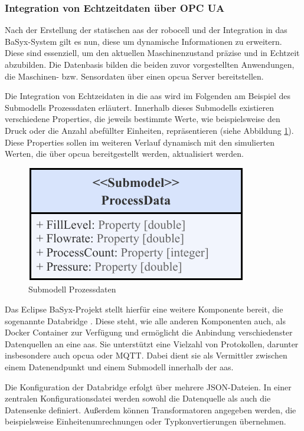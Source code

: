 \subsubsection{Integration von Echtzeitdaten über OPC UA}
Nach der Erstellung der statischen \acs{aas} der robocell und der Integration in das BaSyx-System gilt es nun, diese um dynamische Informationen zu erweitern.
Diese sind essenziell, um den aktuellen Maschinenzustand präzise und in Echtzeit abzubilden.
Die Datenbasis bilden die beiden zuvor vorgestellten Anwendungen, die Maschinen- bzw. Sensordaten über einen \acs{opcua} Server bereitstellen.

Die Integration von Echtzeidaten in die \acs{aas} wird im Folgenden am Beispiel des Submodells Prozessdaten erläutert.
Innerhalb dieses Submodells existieren verschiedene Properties, die jeweils bestimmte Werte, wie beispielsweise den Druck oder die Anzahl abefüllter Einheiten, repräsentieren (siehe Abbildung \ref{fig:SubmodellProzessdaten}). %
Diese Properties sollen im weiteren Verlauf dynamisch mit den simulierten Werten, die über \acs{opcua} bereitgestellt werden, aktualisiert werden.

\begin{figure}[htbp]
    \centering
    \includegraphics{Bilder/OPCUA/SubmodellProzessdaten.pdf}
    \caption{Submodell Prozessdaten}
    \label{fig:SubmodellProzessdaten}
\end{figure}

Das Eclipse BaSyx-Projekt stellt hierfür eine weitere Komponente bereit, die sogenannte Databridge \cite{BaSyxDatabridge}.
Diese steht, wie alle anderen Komponenten auch, als Docker Container zur Verfügung und ermöglicht die Anbindung verschiedenster Datenquellen an eine \acs{aas}.
Sie unterstützt eine Vielzahl von Protokollen, darunter insbesondere auch \acs{opcua} oder MQTT.
Dabei dient sie als Vermittler zwischen einem Datenendpunkt und einem Submodell innerhalb der \acs{aas}.

Die Konfiguration der Databridge erfolgt über mehrere JSON-Dateien.
In einer zentralen Konfigurationsdatei werden sowohl die Datenquelle als auch die Datensenke definiert.
Außerdem können Transformatoren angegeben werden, die beispielsweise Einheitenumrechnungen oder Typkonvertierungen übernehmen.

